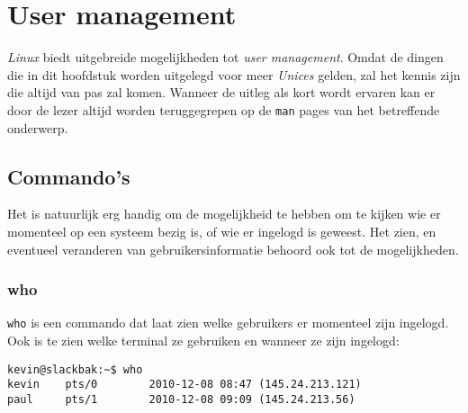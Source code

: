 %
%
%
%

\chapter{User management}
\emph{Linux} biedt uitgebreide mogelijkheden tot \emph{user management}. Omdat de dingen die in dit hoofdstuk worden uitgelegd voor meer \emph{Unices} gelden, zal het kennis zijn die altijd van pas zal komen. Wanneer de uitleg als kort wordt ervaren kan er door de lezer altijd worden teruggegrepen op de \texttt{man} pages van het betreffende onderwerp. 

\section{Commando's}
Het is natuurlijk erg handig om de mogelijkheid te hebben om te kijken wie er momenteel op een systeem bezig is, of wie er ingelogd is geweest. Het zien, en eventueel veranderen van gebruikersinformatie behoord ook tot de mogelijkheden. 

\subsection{who}
\texttt{who} is een commando dat laat zien welke gebruikers er momenteel zijn ingelogd. Ook is te zien welke terminal ze gebruiken en wanneer ze zijn ingelogd: 
\begin{lstlisting}
kevin@slackbak:~$ who
kevin    pts/0        2010-12-08 08:47 (145.24.213.121)
paul     pts/1        2010-12-08 09:09 (145.24.213.56)
\end{lstlisting}%

